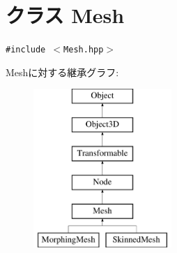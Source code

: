 \hypertarget{classm3g_1_1Mesh}{
\section{クラス Mesh}
\label{classm3g_1_1Mesh}
}
{\tt \#include $<$Mesh.hpp$>$}

Meshに対する継承グラフ:\begin{figure}[H]
\begin{center}
\leavevmode
\includegraphics[height=6cm]{classm3g_1_1Mesh}
\end{center}
\end{figure}
